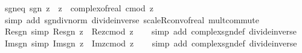 \begin{isabellebody}
\isamarkupfalse%
\ sgn{\isacharunderscore}{\kern0pt}eq{\isacharcolon}{\kern0pt}\ {\isachardoublequoteopen}sgn\ z\ {\isacharequal}{\kern0pt}\ z\ {\isacharslash}{\kern0pt}\ complex{\isacharunderscore}{\kern0pt}of{\isacharunderscore}{\kern0pt}real\ {\isacharparenleft}{\kern0pt}cmod\ z{\isacharparenright}{\kern0pt}{\isachardoublequoteclose}\isanewline
%
\isadelimproof
\ \ %
\endisadelimproof
%
\isatagproof
{}\isamarkupfalse%
\ {\isacharparenleft}{\kern0pt}simp\ add{\isacharcolon}{\kern0pt}\ sgn{\isacharunderscore}{\kern0pt}div{\isacharunderscore}{\kern0pt}norm\ divide{\isacharunderscore}{\kern0pt}inverse\ scaleR{\isacharunderscore}{\kern0pt}conv{\isacharunderscore}{\kern0pt}of{\isacharunderscore}{\kern0pt}real\ mult{\isachardot}{\kern0pt}commute{\isacharparenright}{\kern0pt}%
\endisatagproof
{\isafoldproof}%
%
\isadelimproof
\isanewline
%
\endisadelimproof
\isanewline
{}\isamarkupfalse%
\ Re{\isacharunderscore}{\kern0pt}sgn\ {\isacharbrackleft}{\kern0pt}simp{\isacharbrackright}{\kern0pt}{\isacharcolon}{\kern0pt}\ {\isachardoublequoteopen}Re{\isacharparenleft}{\kern0pt}sgn\ z{\isacharparenright}{\kern0pt}\ {\isacharequal}{\kern0pt}\ Re{\isacharparenleft}{\kern0pt}z{\isacharparenright}{\kern0pt}{\isacharslash}{\kern0pt}cmod\ z{\isachardoublequoteclose}\isanewline
%
\isadelimproof
\ \ %
\endisadelimproof
%
\isatagproof
{}\isamarkupfalse%
\ {\isacharparenleft}{\kern0pt}simp\ add{\isacharcolon}{\kern0pt}\ complex{\isacharunderscore}{\kern0pt}sgn{\isacharunderscore}{\kern0pt}def\ divide{\isacharunderscore}{\kern0pt}inverse{\isacharparenright}{\kern0pt}%
\endisatagproof
{\isafoldproof}%
%
\isadelimproof
\isanewline
%
\endisadelimproof
\isanewline
{}\isamarkupfalse%
\ Im{\isacharunderscore}{\kern0pt}sgn\ {\isacharbrackleft}{\kern0pt}simp{\isacharbrackright}{\kern0pt}{\isacharcolon}{\kern0pt}\ {\isachardoublequoteopen}Im{\isacharparenleft}{\kern0pt}sgn\ z{\isacharparenright}{\kern0pt}\ {\isacharequal}{\kern0pt}\ Im{\isacharparenleft}{\kern0pt}z{\isacharparenright}{\kern0pt}{\isacharslash}{\kern0pt}cmod\ z{\isachardoublequoteclose}\isanewline
%
\isadelimproof
\ \ %
\endisadelimproof
%
\isatagproof
{}\isamarkupfalse%
\ {\isacharparenleft}{\kern0pt}simp\ add{\isacharcolon}{\kern0pt}\ complex{\isacharunderscore}{\kern0pt}sgn{\isacharunderscore}{\kern0pt}def\ divide{\isacharunderscore}{\kern0pt}inverse{\isacharparenright}{\kern0pt}%
\endisatagproof
{\isafoldproof}%
%
\isadelimproof
%
\endisadelimproof
%
\isadelimdocument
%
\endisadelimdocument
%
\isatagdocument
%
\end{isabellebody}
